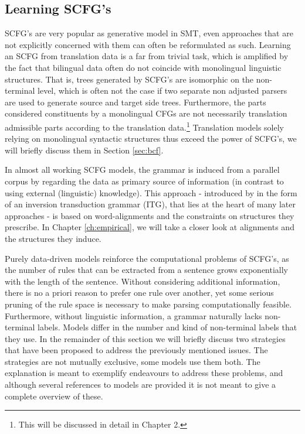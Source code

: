 \documentclass{report}
\theoremstyle{definition}
\theoremstyle{plain}
\begin{document}
\subsection{Learning SCFG's}
\label{subsec:learningSCFGs}

SCFG's are very popular as generative model in SMT, even approaches that are not explicitly concerned with them can often be reformulated as such. Learning an SCFG from translation data is a far from trivial task, which is amplified by the fact that bilingual data often do not coincide with monolingual linguistic structures. That is, trees generated by SCFG's are isomorphic on the non-terminal level, which is often not the case if two separate non adjusted parsers are used to generate source and target side trees. Furthermore, the parts considered constituents by a monolingual CFGs are not necessarily translation admissible parts according to the translation data.\footnote{This will be discussed in detail in Chapter 2.} Translation models solely relying on monolingual syntactic structures thus exceed the power of SCFG's, we will briefly discuss them in Section \ref{sec:bcf}.

In almost all working SCFG models, the grammar is induced from a parallel corpus by regarding the data as primary source of information (in contrast to using external (linguistic) knowledge). This approach - introduced by \cite{wu1995algorithm} in the form of an inversion transduction grammar (ITG), that lies at the heart of many later approaches - is based on word-alignments and the constraints on structures they prescribe. In Chapter \ref{ch:empirical}, we will take a closer look at alignments and the structures they induce.

Purely data-driven models reinforce the computational problems of SCFG's, as the number of rules that can be extracted from a sentence grows exponentially with the length of the sentence\citep{quirk2006dependency}. Without considering additional information, there is no a priori reason to prefer one rule over another, yet some serious pruning of the rule space is necessary to make parsing computationally feasible. Furthermore, without linguistic information, a grammar naturally lacks non-terminal labels. Models differ in the number and kind of non-terminal labels that they use. In the remainder of this section we will briefly discuss two strategies that have been proposed to address the previously mentioned issues. The strategies are not mutually exclusive, some models use them both. The explanation is meant to exemplify endeavours to address these problems, and although several references to models are provided it is not meant to give a complete overview of these.
\end{document}
